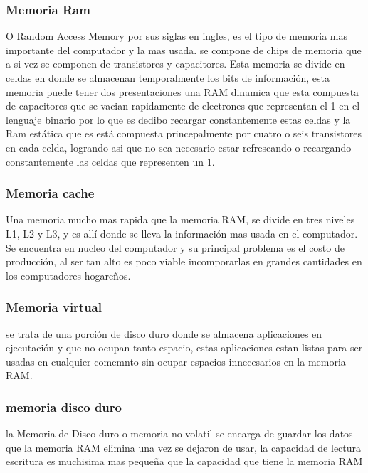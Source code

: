 \documentclass{article}
\begin{document}
        \subsubsection{Memoria Ram}
        O Random Access Memory por sus siglas en ingles, es el tipo de memoria mas importante del computador y la mas usada. se compone de chips de memoria que a si vez se componen de transistores y capacitores. Esta memoria se divide en celdas en donde se almacenan temporalmente los bits de información, esta memoria puede tener dos presentaciones una RAM dinamica que esta compuesta de capacitores que se vacian rapidamente de electrones que representan el 1 en el lenguaje binario por lo que es dedibo recargar constantemente estas celdas y la Ram estática que es está compuesta princepalmente por cuatro o seis transistores en cada celda, logrando asi que no sea necesario estar refrescando o recargando constantemente las celdas que representen un 1.
        
        
        
        
        
        
        
        
        
        
        
        \subsubsection{Memoria cache}
        Una memoria mucho mas rapida que la memoria RAM, se divide en tres niveles L1, L2 y L3, y es allí donde se lleva la información mas usada en el computador. Se encuentra en nucleo del computador y su principal problema es el costo de producción, al ser tan alto es poco viable incomporarlas en grandes cantidades en los computadores hogareños.   
        
        \subsubsection{Memoria virtual}
        se trata de una porción de disco duro donde se almacena aplicaciones en ejecutación y que no ocupan tanto espacio, estas aplicaciones estan listas para ser usadas en cualquier comemnto sin ocupar espacios innecesarios en la memoria RAM.  
        
        \subsubsection{memoria disco duro}
        la Memoria de Disco duro o memoria no volatil se encarga de guardar los datos que la memoria RAM elimina una vez se dejaron de usar, la capacidad de lectura  escritura es muchisima mas pequeña que la capacidad que tiene la memoria RAM
        
\end{document}
